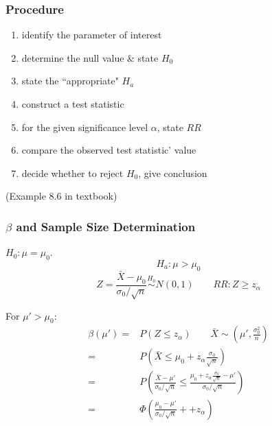\noindent{}

\subsubsection{Procedure}
\begin{enumerate}
\item identify the parameter of interest
\item determine the null value \& state $H_0$
\item state the ``appropriate" $H_a$
\item construct a test statistic
\item for the given significance level $\alpha$, state $RR$
\item compare the observed test statistic' value
\item decide whether to reject $H_0$, give conclusion
\end{enumerate}

\begin{exmp}
(Example 8.6 in textbook)
\end{exmp}

\subsubsection{$\beta$ and Sample Size Determination}
$H_0:\mu=\mu_0$. 
\[H_a:\mu >\mu_0\]
\[Z=\frac{\bar{X}-\mu_0}{\sigma_0/\sqrt{n}}\overset{H_0}{\sim} N(0,1) \qquad RR: Z\geq z_{\alpha}\]

For $\mu'>\mu_0$: 
\begin{align*}
\beta(\mu')= & P(Z\leq z_{\alpha}) \qquad \bar{X}\sim \left(\mu',\frac{\sigma_0^2}{n}\right) \\
= & P\left(\bar{X}\leq \mu_0+z_{\alpha}\frac{\sigma_0}{\sqrt{n}}\right) \\
= & P\left( \frac{\bar{X}-\mu'}{\sigma_0/\sqrt{n}} \leq \frac{\mu_0+z_{\alpha} \frac{\sigma_0}{\sqrt{n}}-\mu'}	{\sigma_0/\sqrt{n} } \right) \\
= & \Phi\left( \frac{\mu_0-\mu'}	{\sigma_0/\sqrt{n} }++z_{\alpha}  \right)
\end{align*}

